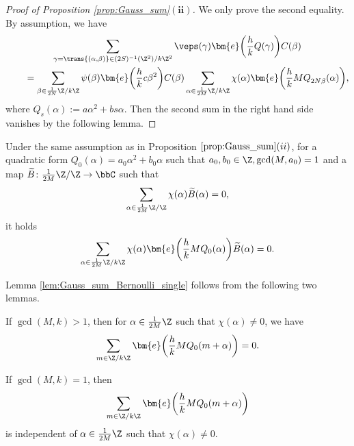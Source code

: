 \begin{proof}[Proof of Proposition \ref{prop:Gauss_sum}$\boldsymbol{(ii)}$]
	We only prove the second equality.
	By assumption, we have
	\begin{gather*}
		\sum_{\gamma = \trans{(\alpha, \beta)} \in (2S)^{-1}(\Z^2)/k\Z^2} \veps(\gamma)
		\bm{e}\bigg(\frac{h}{k} Q(\gamma)\bigg) C(\beta)
\\ \qquad
		{}= \sum_{\beta \in \frac{1}{2N}\Z/k\Z} \psi(\beta)
		\bm{e}\bigg( \frac{h}{k} c \beta^2 \bigg) C(\beta)
		\sum_{\alpha \in \frac{1}{2M}\Z/k\Z} \chi(\alpha)
		\bm{e}\bigg( \frac{h}{k} M Q_{2N\beta}^{} (\alpha) \bigg),
	\end{gather*}
	where $ Q_s(\alpha) := a \alpha^2 + bs \alpha $.
	Then the second sum in the right hand side vanishes by the following lemma.
\end{proof}

\begin{lem} \label{lem:Gauss_sum_Bernoulli_single}
	Under the same assumption as in Proposition $\ref{prop:Gauss_sum}(ii)$, for a quadratic form $ Q_0(\alpha)\allowbreak = a_0 \alpha^2 + b_0 \alpha $ such that $ a_0, b_0 \in \Z, \gcd(M, a_0) = 1 $ and a map $ \widetilde{B} \colon \frac{1}{2M}\Z/\Z \to \bbC $ such that
	\begin{gather*}
	\sum_{\alpha \in \frac{1}{2M}\Z/\Z} \chi(\alpha) \widetilde{B}(\alpha) = 0,
	\end{gather*}
	it holds
	\begin{gather*}
	\sum_{\alpha \in \frac{1}{2M}\Z/k\Z} \chi(\alpha) \bm{e}\bigg( \frac{h}{k} M Q_0 (\alpha) \bigg) \widetilde{B}(\alpha) = 0.
	\end{gather*}
\end{lem}

Lemma \ref{lem:Gauss_sum_Bernoulli_single} follows from the following two lemmas.

\begin{lem} \label{lem:Gauss_sum_zero_Bernoulli}
	If $ \gcd(M, k) > 1 $, then for $ \alpha \in \frac{1}{2M} \Z $ such that $ \chi(\alpha) \neq 0 $, we have
	\begin{gather*}
	\sum_{m \in \Z/k\Z} \bm{e}\bigg( \frac{h}{k} M Q_0 (m + \alpha) \bigg)
	= 0.
	\end{gather*}
\end{lem}

\begin{lem} \label{lem:Gauss_sum_indep_Bernoulli}
	If $ \gcd(M, k) = 1 $, then
	\begin{gather*}
	\sum_{m \in \Z/k\Z} \bm{e}\bigg( \frac{h}{k} M Q_0 (m + \alpha ) \bigg)
	\end{gather*}
	is independent of $ \alpha \in \frac{1}{2M} \Z $ such that $ \chi(\alpha) \neq 0 $.
\end{lem}

